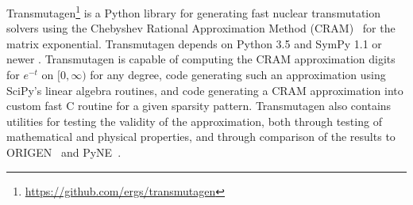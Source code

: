 Transmutagen\footnote{\url{https://github.com/ergs/transmutagen}} is a Python
library for generating fast nuclear transmutation solvers using the Chebyshev
Rational Approximation Method (CRAM)~\cite{ationneeded} for the matrix
exponential. Transmutagen depends on Python 3.5 and SymPy 1.1 or newer
. Transmutagen is capable of computing the CRAM
approximation digits for $e^{-t}$ on $[0, \infty)$ for any degree, code
generating such an approximation using SciPy's linear algebra routines, and
code generating a CRAM approximation into custom fast C routine for a given
sparsity pattern. Transmutagen also contains utilities for testing the
validity of the approximation, both through testing of mathematical and
physical properties, and through comparison of the results to
ORIGEN~\cite{ationneeded} and PyNE~\cite{ationneeded}.
